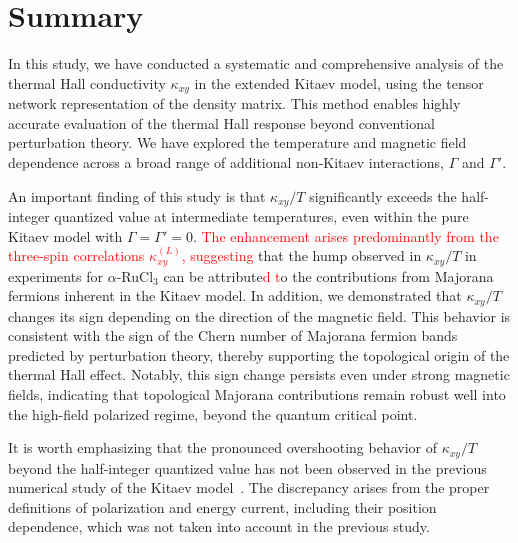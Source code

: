 \documentclass[twocolumn,superscriptaddress,showpacs, longbibliography, aps, prx]{revtex4-2}
\newcommand{\red}[1]{\textcolor{red}{#1}}
\begin{document}
\section{Summary}
\label{sec:Summary}
In this study, we have conducted a systematic and comprehensive analysis of the thermal Hall conductivity $\kappa_{xy}$ in the extended Kitaev model, using the tensor network representation of the density matrix. 
This method enables highly accurate evaluation of the thermal Hall response beyond conventional perturbation theory. 
We have explored the temperature and magnetic field dependence across a broad range of additional non-Kitaev interactions, $\Gamma$ and $\Gamma'$. 

An important finding of this study is that $\kappa_{xy}/T$ significantly exceeds the half-integer quantized value at intermediate temperatures, even within the pure Kitaev model with $\Gamma=\Gamma'=0$. 
\red{The enhancement arises predominantly from the three-spin correlations $\kappa_{xy}^{(L)}$, suggesting} that the hump observed in $\kappa_{xy}/T$ in experiments for $\alpha$-RuCl$_3$ can be attribute\red{d %
t}o the contributions from Majorana fermions inherent in the Kitaev model. 
In addition, we demonstrated that $\kappa_{xy}/T$ changes its sign depending on the direction of the magnetic field. 
This behavior is consistent with the sign of the Chern number of Majorana fermion bands predicted by perturbation theory, thereby supporting the topological origin of the thermal Hall effect. 
Notably, this sign change persists even under strong magnetic fields, indicating that topological Majorana contributions remain robust well into the high-field polarized regime, beyond the quantum critical point. 

It is worth emphasizing that the pronounced overshooting behavior of $\kappa_{xy}/T$ beyond the half-integer quantized value has not been observed in the previous numerical study of the Kitaev model~\cite{KumarT2023}. 
The discrepancy arises from the proper definitions of polarization and energy current, including their position dependence, which was not taken into account in the previous study. 
\end{document}
